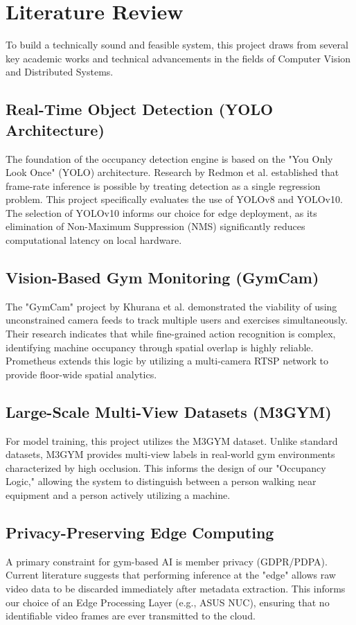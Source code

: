 \section{Literature Review}
\label{section:literature-review}

To build a technically sound and feasible system, this project draws from several key academic works and technical advancements in the fields of Computer Vision and Distributed Systems.

\subsection{Real-Time Object Detection (YOLO Architecture)}
The foundation of the occupancy detection engine is based on the "You Only Look Once" (YOLO) architecture. Research by Redmon et al. established that frame-rate inference is possible by treating detection as a single regression problem. This project specifically evaluates the use of YOLOv8 and YOLOv10. The selection of YOLOv10 informs our choice for edge deployment, as its elimination of Non-Maximum Suppression (NMS) significantly reduces computational latency on local hardware.

\subsection{Vision-Based Gym Monitoring (GymCam)}
The "GymCam" project by Khurana et al. demonstrated the viability of using unconstrained camera feeds to track multiple users and exercises simultaneously. Their research indicates that while fine-grained action recognition is complex, identifying machine occupancy through spatial overlap is highly reliable. Prometheus extends this logic by utilizing a multi-camera RTSP network to provide floor-wide spatial analytics.

\subsection{Large-Scale Multi-View Datasets (M3GYM)}
For model training, this project utilizes the M3GYM dataset. Unlike standard datasets, M3GYM provides multi-view labels in real-world gym environments characterized by high occlusion. This informs the design of our "Occupancy Logic," allowing the system to distinguish between a person walking near equipment and a person actively utilizing a machine.

\subsection{Privacy-Preserving Edge Computing}
A primary constraint for gym-based AI is member privacy (GDPR/PDPA). Current literature suggests that performing inference at the "edge" allows raw video data to be discarded immediately after metadata extraction. This informs our choice of an Edge Processing Layer (e.g., ASUS NUC), ensuring that no identifiable video frames are ever transmitted to the cloud.